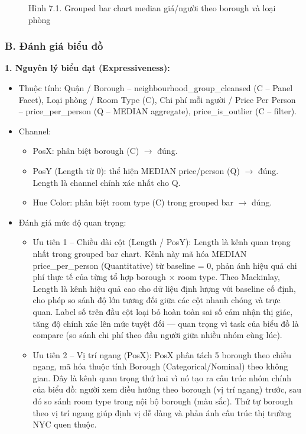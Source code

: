 \begin{figure}[H]
    \centering
    \caption{Hình 7.1. Grouped bar chart median giá/người theo borough và loại phòng}
    \label{fig:domain-task7-chart1}
\end{figure}

\subsubsection*{B. Đánh giá biểu đồ}

\textbf{1. Nguyên lý biểu đạt (Expressiveness):}

\begin{itemize}
    \item Thuộc tính: Quận / Borough -- neighbourhood\_group\_cleansed (C -- Panel Facet), Loại phòng / Room Type (C), Chi phí mỗi người / Price Per Person -- price\_per\_person (Q -- MEDIAN aggregate), price\_is\_outlier (C -- filter).
    \item Channel:
    \begin{itemize}
        \item PosX: phân biệt borough (C) $\rightarrow$ đúng.
        \item PosY (Length từ 0): thể hiện MEDIAN price/person (Q) $\rightarrow$ đúng. Length là channel chính xác nhất cho Q.
        \item Hue Color: phân biệt room type (C) trong grouped bar $\rightarrow$ đúng.
    \end{itemize}
    \item Đánh giá mức độ quan trọng:
    \begin{itemize}
        \item Ưu tiên 1 -- Chiều dài cột (Length / PosY): Length là kênh quan trọng nhất trong grouped bar chart. Kênh này mã hóa MEDIAN price\_per\_person (Quantitative) từ baseline = 0, phản ánh hiệu quả chi phí thực tế của từng tổ hợp borough $\times$ room type. Theo Mackinlay, Length là kênh hiệu quả cao cho dữ liệu định lượng với baseline cố định, cho phép so sánh độ lớn tương đối giữa các cột nhanh chóng và trực quan. Label số trên đầu cột loại bỏ hoàn toàn sai số cảm nhận thị giác, tăng độ chính xác lên mức tuyệt đối --- quan trọng vì task của biểu đồ là compare (so sánh chi phí theo đầu người giữa nhiều nhóm cùng lúc).
        \item Ưu tiên 2 -- Vị trí ngang (PosX): PosX phân tách 5 borough theo chiều ngang, mã hóa thuộc tính Borough (Categorical/Nominal) theo không gian. Đây là kênh quan trọng thứ hai vì nó tạo ra cấu trúc nhóm chính của biểu đồ: người xem điều hướng theo borough (vị trí ngang) trước, sau đó so sánh room type trong nội bộ borough (màu sắc). Thứ tự borough theo vị trí ngang giúp định vị dễ dàng và phản ánh cấu trúc thị trường NYC quen thuộc.

\end{itemize}
\end{itemize}
